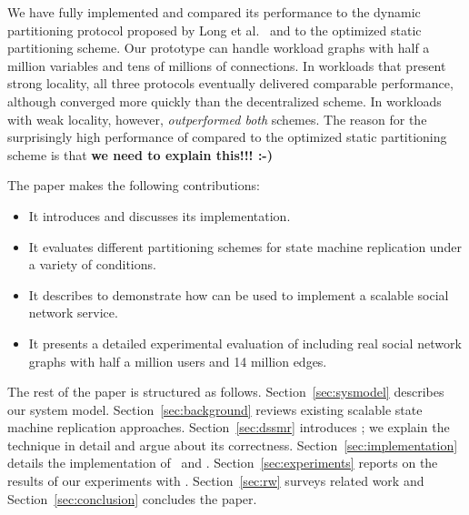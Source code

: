 {We have fully implemented \dynastar and compared its performance to
the dynamic partitioning protocol proposed by Long et
al.~\cite{hoang2016} and to the optimized static partitioning scheme.
Our prototype can handle workload graphs with half a million variables
and tens of millions of connections.  In workloads that present strong
locality, all three protocols eventually delivered comparable
performance, although \dynastar converged more quickly than the
decentralized scheme.  In workloads with weak locality, however,
\dynastar \emph{outperformed both} schemes.  The reason for the
surprisingly high performance of \dynastar compared to the optimized
static partitioning scheme is that \textbf{we need to explain this!!!
:-)}  

The paper makes the following contributions:
\begin{itemize}
\item It introduces \dynastar and discusses its implementation. 
\item It evaluates different partitioning schemes for state machine replication under a variety of conditions.
\item It describes \appname{} to demonstrate how \libname{} can be used to implement a scalable social network service.
\item It presents a detailed experimental evaluation of \dynastar including real social network graphs with half a million users and 14 million edges.
\end{itemize}

The rest of the paper is structured as follows.
Section~\ref{sec:sysmodel} describes our system model.
Section~\ref{sec:background} reviews existing scalable state machine replication approaches.
Section~\ref{sec:dssmr} introduces \dssmr{}; we explain the technique in detail and argue about its correctness.
Section~\ref{sec:implementation} details the implementation of \libname\ and \appname{}.
Section~\ref{sec:experiments} reports on the results of our experiments with \dssmr{}.
Section~\ref{sec:rw} surveys related work and
Section~\ref{sec:conclusion} concludes the paper.




}
